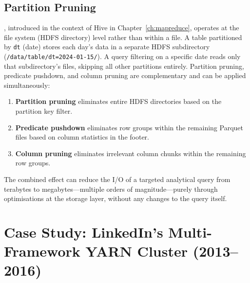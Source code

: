 \subsection{Partition Pruning}
\label{subsec:partition-pruning-ch5}

, introduced in the context of Hive in
Chapter~\ref{ch:mapreduce}, operates at the file system (HDFS directory)
level rather than within a file. A table partitioned by \texttt{dt}
(date) stores each day's data in a separate HDFS subdirectory
(\texttt{/data/table/dt=2024-01-15/}). A query filtering on a specific
date reads only that subdirectory's files, skipping all other partitions
entirely. Partition pruning, predicate pushdown, and column pruning are
complementary and can be applied simultaneously:

\begin{enumerate}
  \item \textbf{Partition pruning} eliminates entire HDFS directories
        based on the partition key filter.
  \item \textbf{Predicate pushdown} eliminates row groups within the
        remaining Parquet files based on column statistics in the footer.
  \item \textbf{Column pruning} eliminates irrelevant column chunks
        within the remaining row groups.
\end{enumerate}

The combined effect can reduce the I/O of a targeted analytical query
from terabytes to megabytes---multiple orders of magnitude---purely
through optimisations at the storage layer, without any changes to the
query itself.

\section{Case Study: LinkedIn's Multi-Framework YARN Cluster (2013--2016)}
\label{sec:linkedin-case}

